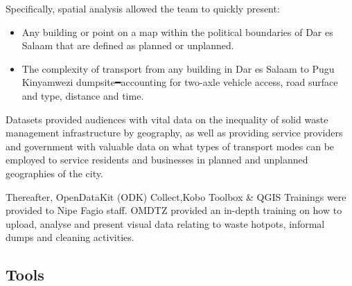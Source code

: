 \documentclass[a4paper,12pt,twoside]{article}
\begin{document}
    Specifically, spatial analysis allowed the team to quickly present:
    \begin{itemize}
    \item Any building or point on a map within the political boundaries of Dar es Salaam that are defined as planned or unplanned.   
    \item The complexity of transport from any building in Dar es Salaam to Pugu Kinyamwezi dumpsite━accounting for two-axle vehicle access, road surface and type, distance and time. 
    \end{itemize} 

    Datasets provided audiences with vital data on the inequality of solid waste management infrastructure by geography, as well as providing service providers and government with valuable data on what types of transport modes can be employed to service residents and businesses in planned and unplanned geographies of the city.

    Thereafter, OpenDataKit (ODK) Collect,Kobo Toolbox & QGIS Trainings were provided to Nipe Fagio staff. OMDTZ provided an in-depth training on how to upload, analyse and present visual data relating to waste hotpots, informal dumps and cleaning activities.

\subsection{Tools}
\end{document}
